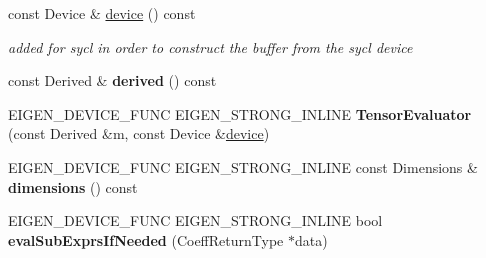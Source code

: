 \begin{DoxyCompactItemize}
\item 
\mbox{\label{struct_eigen_1_1_tensor_evaluator_3_01const_01_derived_00_01_device_01_4_ac5b59eb35ea904aca2c6e6fa6e719ff4}} 
const Device \& \hyperlink{struct_eigen_1_1_tensor_evaluator_3_01const_01_derived_00_01_device_01_4_ac5b59eb35ea904aca2c6e6fa6e719ff4}{device} () const
\begin{DoxyCompactList}\small\item\em added for sycl in order to construct the buffer from the sycl device \end{DoxyCompactList}\item 
\mbox{\label{struct_eigen_1_1_tensor_evaluator_3_01const_01_derived_00_01_device_01_4_ae6b711ee9568ec097de99fd2903b33f1}} 
const Derived \& {\bfseries derived} () const
\item 
\mbox{\label{struct_eigen_1_1_tensor_evaluator_3_01const_01_derived_00_01_device_01_4_ac45b17691ceec9190e1ab8b38677eec0}} 
E\+I\+G\+E\+N\+\_\+\+D\+E\+V\+I\+C\+E\+\_\+\+F\+U\+NC E\+I\+G\+E\+N\+\_\+\+S\+T\+R\+O\+N\+G\+\_\+\+I\+N\+L\+I\+NE {\bfseries Tensor\+Evaluator} (const Derived \&m, const Device \&\hyperlink{struct_eigen_1_1_tensor_evaluator_3_01const_01_derived_00_01_device_01_4_ac5b59eb35ea904aca2c6e6fa6e719ff4}{device})
\item 
\mbox{\label{struct_eigen_1_1_tensor_evaluator_3_01const_01_derived_00_01_device_01_4_a7da37d1c431539f64140df9cf9903042}} 
E\+I\+G\+E\+N\+\_\+\+D\+E\+V\+I\+C\+E\+\_\+\+F\+U\+NC E\+I\+G\+E\+N\+\_\+\+S\+T\+R\+O\+N\+G\+\_\+\+I\+N\+L\+I\+NE const Dimensions \& {\bfseries dimensions} () const
\item 
\mbox{\label{struct_eigen_1_1_tensor_evaluator_3_01const_01_derived_00_01_device_01_4_a430b1109265b3ef672bd7e583bc74062}} 
E\+I\+G\+E\+N\+\_\+\+D\+E\+V\+I\+C\+E\+\_\+\+F\+U\+NC E\+I\+G\+E\+N\+\_\+\+S\+T\+R\+O\+N\+G\+\_\+\+I\+N\+L\+I\+NE bool {\bfseries eval\+Sub\+Exprs\+If\+Needed} (Coeff\+Return\+Type $\ast$data)
\item 

\end{DoxyCompactItemize}
